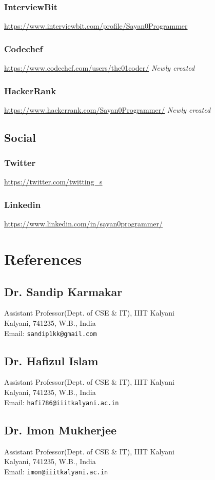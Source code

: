 \documentclass{article}
\begin{document}
\subsubsection{InterviewBit}
\url{https://www.interviewbit.com/profile/Sayan0Programmer}
\subsubsection{Codechef}
\url{https://www.codechef.com/users/the01coder/}
\textit{Newly created}
\subsubsection{HackerRank}
\url{https://www.hackerrank.com/Sayan0Programmer/}
\textit{Newly created}
\subsection{Social}
\subsubsection{Twitter}
\url{https://twitter.com/twitting\_s}
\subsubsection{Linkedin}
\url{https://www.linkedin.com/in/sayan0programmer/}

\section{References}
\subsection{Dr. Sandip Karmakar}
Assistant Professor(Dept. of CSE \& IT), IIIT Kalyani\\
Kalyani, 741235, W.B., India\\
Email: \texttt{sandip1kk@gmail.com}
\subsection{Dr. Hafizul Islam}
Assistant Professor(Dept. of CSE \& IT), IIIT Kalyani\\
Kalyani, 741235, W.B., India\\
Email: \texttt{hafi786@iiitkalyani.ac.in}
\subsection{Dr. Imon Mukherjee}
Assistant Professor(Dept. of CSE \& IT), IIIT Kalyani\\
Kalyani, 741235, W.B., India\\
Email: \texttt{imon@iiitkalyani.ac.in}
\end{document}
